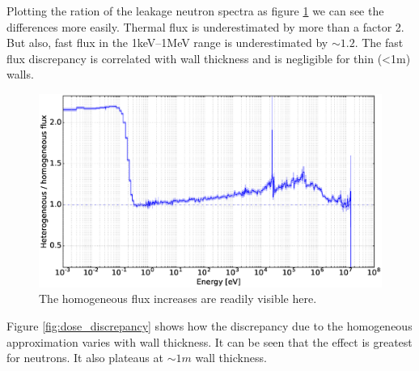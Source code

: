 Plotting the ration of the leakage neutron spectra as figure \ref{fig:relative_neutron_spectra} we can see the differences more easily. Thermal flux is underestimated by more than a factor 2. But also, fast flux in the 1keV--1MeV range is underestimated by $\sim1.2$. The fast flux discrepancy is correlated with wall thickness and is negligible for thin (\textless 1m) walls.

\begin{figure}[H]
  \includegraphics[width=\textwidth]{relative_neutron_spectra}
  \caption{The homogeneous flux increases are readily visible here.}
  \label{fig:relative_neutron_spectra}
\end{figure}


Figure \ref{fig:dose_discrepancy} shows how the discrepancy due to the homogeneous approximation varies with wall thickness. It can be seen that the effect is greatest for neutrons. It also plateaus at $\sim 1m$ wall thickness.

